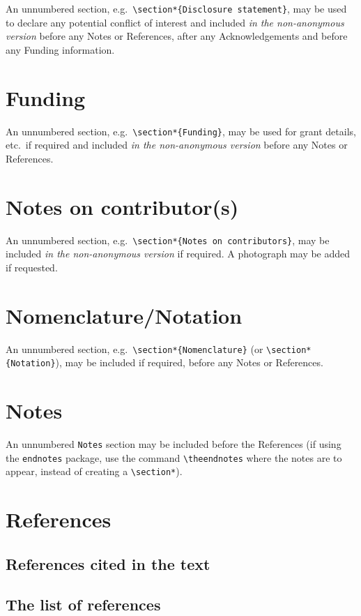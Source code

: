 \documentclass[]{interact}
\theoremstyle{plain}%
\theoremstyle{definition}
\theoremstyle{remark}
\begin{document}
An unnumbered section,
e.g.~\texttt{\textbackslash{}section*\{Disclosure\ statement\}}, may be
used to declare any potential conflict of interest and included \emph{in
the non-anonymous version} before any Notes or References, after any
Acknowledgements and before any Funding information.

\section*{Funding}\label{funding}

An unnumbered section,
e.g.~\texttt{\textbackslash{}section*\{Funding\}}, may be used for grant
details, etc.~if required and included \emph{in the non-anonymous
version} before any Notes or References.

\section*{Notes on contributor(s)}\label{notes-on-contributors}

An unnumbered section,
e.g.~\texttt{\textbackslash{}section*\{Notes\ on\ contributors\}}, may
be included \emph{in the non-anonymous version} if required. A
photograph may be added if requested.

\section*{Nomenclature/Notation}\label{nomenclaturenotation}

An unnumbered section,
e.g.~\texttt{\textbackslash{}section*\{Nomenclature\}} (or
\texttt{\textbackslash{}section*\{Notation\}}), may be included if
required, before any Notes or References.

\section*{Notes}\label{notes}

An unnumbered \texttt{Notes} section may be included before the
References (if using the \texttt{endnotes} package, use the command
\texttt{\textbackslash{}theendnotes} where the notes are to appear,
instead of creating a \texttt{\textbackslash{}section*}).

\section{References}\label{references}

\subsection{References cited in the
text}\label{references-cited-in-the-text}

\subsection{The list of references}\label{the-list-of-references}






\end{document}
